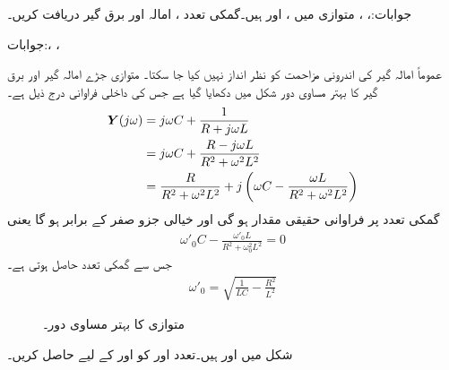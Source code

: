 جوابات:، ، 
متوازی  میں ،  اور  ہیں۔گمکی تعدد ، امالہ اور برق گیر دریافت کریں۔

جوابات:، ، 

عموماً امالہ گیر کی اندرونی مزاحمت کو نظر انداز نہیں کیا جا سکتا۔ متوازی جڑے امالہ گیر اور برق گیر کا بہتر مساوی دور شکل  میں دکھایا گیا ہے جس کی داخلی فراوانی درج ذیل ہے۔
\begin{align*}
{\ensuremath{{\boldsymbol{Y}}}}(j\omega)&=j\omega C+\frac{1}{R+j\omega L}\\
&=j\omega C+\frac{R-j\omega L}{R^2+\omega^2 L^2}\\
&=\frac{R}{R^2+\omega^2 L^2}+j\left(\omega C-\frac{\omega L}{R^2+\omega^2 L^2}\right)
\end{align*}
گمکی تعدد  پر فراوانی حقیقی مقدار ہو گی اور خیالی جزو صفر کے برابر ہو گا یعنی
\begin{align}
\omega'_0 C-\frac{\omega'_0 L}{R^2+\omega_0^2 L^2}=0
\end{align}
جس سے گمکی تعدد حاصل ہوتی ہے۔
\begin{align}
\omega'_0=\sqrt{\frac{1}{LC}-\frac{R^2}{L^2}}
\end{align}
%
\begin{figure}
\centering
{}
\caption{متوازی  کا بہتر مساوی دور۔}
\label{شکل_تعددی_بہتر_متوازی_دور}
\end{figure}
شکل  میں  اور  ہیں۔تعدد  اور  کو  اور  کے لیے حاصل کریں۔

